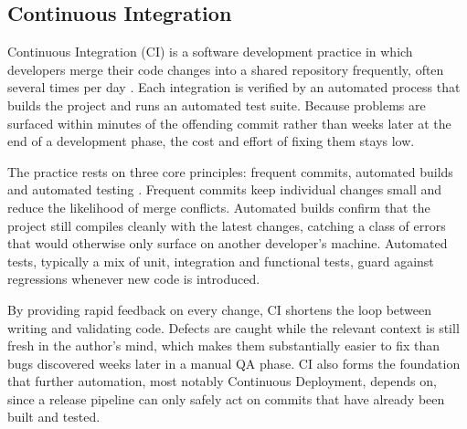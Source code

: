 \subsection{Continuous Integration}
Continuous Integration (CI) is a software development practice in which developers merge their code changes into a shared repository frequently, often several times per day \cite{b5}. Each integration is verified by an automated process that builds the project and runs an automated test suite. Because problems are surfaced within minutes of the offending commit rather than weeks later at the end of a development phase, the cost and effort of fixing them stays low.

The practice rests on three core principles: frequent commits, automated builds and automated testing \cite{b5}. Frequent commits keep individual changes small and reduce the likelihood of merge conflicts. Automated builds confirm that the project still compiles cleanly with the latest changes, catching a class of errors that would otherwise only surface on another developer's machine. Automated tests, typically a mix of unit, integration and functional tests, guard against regressions whenever new code is introduced.

By providing rapid feedback on every change, CI shortens the loop between writing and validating code. Defects are caught while the relevant context is still fresh in the author's mind, which makes them substantially easier to fix than bugs discovered weeks later in a manual QA phase. CI also forms the foundation that further automation, most notably Continuous Deployment, depends on, since a release pipeline can only safely act on commits that have already been built and tested.
